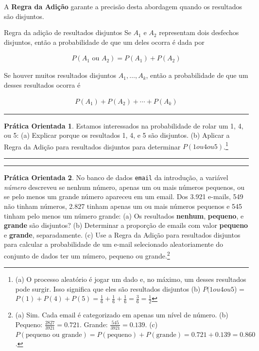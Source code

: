 \documentclass[
]{book}
\theoremstyle{definition}
\theoremstyle{definition}
\theoremstyle{definition}
\newtheorem{exercise}{Prática Orientada}[chapter]
\theoremstyle{definition}
\theoremstyle{remark}
\begin{document}
A \textbf{Regra da Adição} garante a precisão desta abordagem quando os resultados são disjuntos.

Regra da adição de resultados disjuntos Se \(A_1\) e \(A_2\) representam dois desfechos disjuntos, então a probabilidade de que um deles ocorra é dada por

\begin{eqnarray*}
P(A_1\text{ ou } A_2) = P(A_1) + P(A_2)
\end{eqnarray*}

Se houver muitos resultados disjuntos \(A_1,\dots, A_k\), então a probabilidade de que um desses resultados ocorra é

\begin{eqnarray}
P(A_1) + P(A_2) + \cdots + P(A_k)
\end{eqnarray}

\begin{center}\rule{0.5\linewidth}{0.5pt}\end{center}

\begin{exercise}
\protect\hypertarget{exr:unnamed-chunk-43}{}{\label{exr:unnamed-chunk-43} }Estamos interessados na probabilidade de rolar um 1, 4, ou 5: (a) Explicar porque os resultados 1, 4, e 5 são disjuntos. (b) Aplicar a Regra da Adição para resultados disjuntos para determinar \(P(1 ou 4 ou 5)\).\footnote{(a) O processo aleatório é jogar um dado e, no máximo, um desses resultados pode surgir. Isso significa que eles são resultados disjuntos (b) \(P(1 ou 4 ou 5\)) = \(P(1) + P(4) + P(5) = \frac{1}{6} + \frac{1}{6} + \frac{1}{6} = \frac{3}{6} = \frac{1}{2}\)}
\end{exercise}

\begin{center}\rule{0.5\linewidth}{0.5pt}\end{center}

\begin{center}\rule{0.5\linewidth}{0.5pt}\end{center}

\begin{exercise}
\protect\hypertarget{exr:unnamed-chunk-44}{}{\label{exr:unnamed-chunk-44} }No banco de dados \texttt{email} da introdução, a variável \emph{número} descreveu se nenhum número, apenas um ou mais números pequenos, ou se pelo menos um grande número apareceu em um email. Dos 3.921 e-mails, 549 não tinham números, 2.827 tinham apenas um ou mais números pequenos e 545 tinham pelo menos um número grande: (a) Os resultados \textbf{nenhum}, \textbf{pequeno}, e \textbf{grande} são disjuntos? (b) Determinar a proporção de emails com valor \textbf{pequeno} e \textbf{grande}, separadamente. (c) Use a Regra da Adição para resultados disjuntos para calcular a probabilidade de um e-mail selecionado aleatoriamente do conjunto de dados ter um número, pequeno ou grande.\footnote{(a) Sim. Cada email é categorizado em apenas um nível de número. (b) Pequeno: \(\frac{2827}{3921} = 0.721\). Grande: \(\frac{545}{3921} = 0.139\). (c) \(P(\text{pequeno ou grande}) = P(\text{pequeno}) + P(\text{grande}) = 0.721 + 0.139 = 0.860\).}
\end{exercise}
\end{document}
